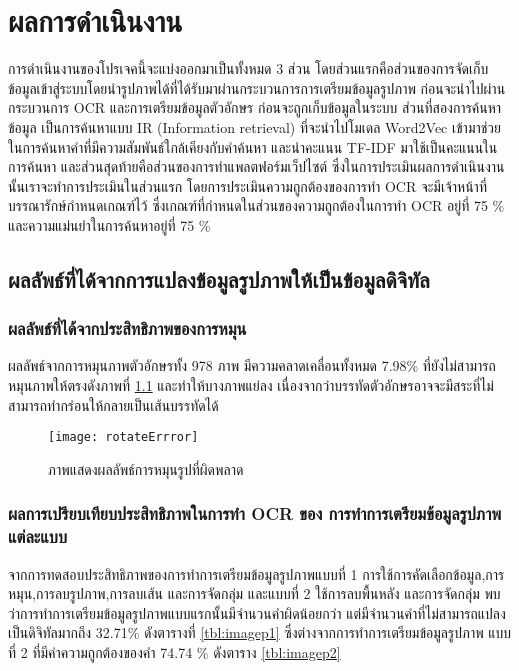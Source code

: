 \chapter{ผลการดำเนินงาน}

การดำเนินงานของโปรเจคนี้จะแบ่งออกมาเป็นทั้งหมด 3 ส่วน โดยส่วนแรกคือส่วนของการจัดเก็บข้อมูลเข้าสู่ระบบโดยนำรูปภาพได้ที่ได้รับมาผ่านกระบวนการการเตรียมข้อมูลรูปภาพ 
ก่อนจะนำไปผ่านกระบวนการ OCR และการเตรียมข้อมูลตัวอักษร ก่อนจะถูกเก็บข้อมูลในระบบ ส่วนที่สองการค้นหาข้อมูล เป็นการค้นหาแบบ IR (Information retrieval) 
ที่จะนำไปโมเดล Word2Vec เข้ามาช่วยในการค้นหาคำที่มีความสัมพันธ์ใกล้เคียงกับคำค้นหา และนำคะแนน TF-IDF มาใช้เป็นคะแนนในการค้นหา และส่วนสุดท้ายคือส่วนของการทำแพลตฟอร์มเว็ปไซต์
ซึ่งในการประเมินผลการดำเนินงานนั้นเราจะทำการประเมินในส่วนแรก โดยการประเมินความถูกต้องของการทำ OCR จะมีเจ้าหน้าที่บรรณารักษ์กำหนดเกณฑ์ไว้ 
ซึ่งเกณฑ์ที่กำหนดในส่วนของความถูกต้องในการทำ OCR อยู่ที่ 75 \% และความแม่นยำในการค้นหาอยู่ที่ 75 \%

\section{ผลลัพธ์ที่ได้จากการแปลงข้อมูลรูปภาพให้เป็นข้อมูลดิจิทัล}

\subsection{ผลลัพธ์ที่ได้จากประสิทธิภาพของการหมุน}
ผลลัพธ์จากการหมุนภาพตัวอักษรทั้ง 978 ภาพ มีความคลาดเคลื่อนทั้งหมด 7.98\% ที่ยังไม่สามารถหมุนภาพให้ตรงดังภาพที่ \ref{fig:rotateErrror} 
และทำให้บางภาพแย่ลง เนื่องจากว่าบรรทัดตัวอักษรอาจจะมีสระที่ไม่สามารถทำกร่อนให้กลายเป็นเส้นบรรทัดได้

\begin{figure}[H]
    \centering
    \texttt{[image: rotateErrror]}
    \caption{ภาพแสดงผลลัพธ์การหมุนรูปที่ผิดพลาด}\label{fig:rotateErrror}
\end{figure}

\subsection{ผลการเปรียบเทียบประสิทธิภาพในการทำ OCR ของ การทำการเตรียมข้อมูลรูปภาพ แต่ละแบบ}

จากการทดสอบประสิทธิภาพของการทำการเตรียมข้อมูลรูปภาพแบบที่ 1 การใช้การคัดเลือกข้อมูล,การหมุน,การลบรูปภาพ,การลบเส้น และการจัดกลุ่ม
และแบบที่ 2 ใช้การลบพื้นหลัง และการจัดกลุ่ม พบว่าการทำการเตรียมข้อมูลรูปภาพแบบแรกนั้นมีจำนวนคำผิดน้อยกว่า แต่มีจำนวนคำที่ไม่สามารถแปลงเป็นดิจิทัลมากถึง 
32.71\% ดังตารางที่ \ref{tbl:imagep1} ซึ่งต่างจากการทำการเตรียมข้อมูลรูปภาพ แบบที่ 2 ที่มีค่าความถูกต้องของคำ 
74.74 \% ดังตาราง \ref{tbl:imagep2}

